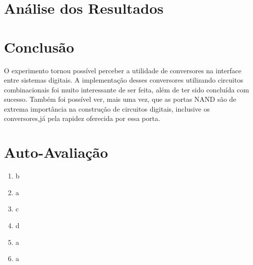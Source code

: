 \documentclass[12pt]{article}
\begin{document}
\section{Análise dos Resultados}
\label{sec:Resultados}


\section{Conclusão}
\label{sec:Conclusao}

O experimento tornou possível perceber a utilidade de conversores na interface entre sistemas digitais. A implementação desses conversores utilizando circuitos combinacionais foi muito interessante de ser feita, além de ter sido concluída com sucesso. Também foi possível ver, mais uma vez, que as portas NAND são de extrema importância na construção de circuitos digitais, inclusive os conversores,já pela rapidez oferecida por essa porta.






\newpage 
\section*{Auto-Avaliação}

\begin{enumerate}
    \item b
    \item a
    \item c
    \item d
    \item a
    \item a
\end{enumerate}
\end{document}
